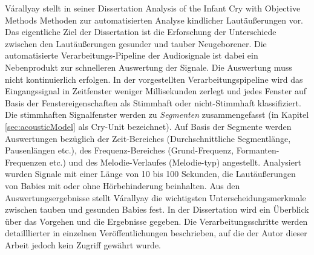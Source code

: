 Várallyay stellt in seiner Dissertation \glqq Analysis of the Infant Cry with Objective Methods\grqq{} \cite{cry_thesis} Methoden zur automatisierten Analyse kindlicher Lautäußerungen vor. Das eigentliche Ziel der Dissertation ist die Erforschung der Unterschiede zwischen den Lautäußerungen gesunder und tauber Neugeborener. Die automatisierte Verarbeitungs-Pipeline der Audiosignale ist dabei ein \glqq Nebenprodukt\grqq{} zur schnelleren Auswertung der Signale. Die Auswertung muss nicht kontinuierlich erfolgen. In der vorgestellten Verarbeitungspipeline wird das Eingangssignal in Zeitfenster weniger Millisekunden zerlegt und jedes Fenster auf Basis der Fenstereigenschaften als Stimmhaft oder nicht-Stimmhaft klassifiziert. Die stimmhaften Signalfenster werden zu \emph{Segmenten} zusammengefasst (in Kapitel \ref{sec:acousticModel} als Cry-Unit bezeichnet). Auf Basis der Segmente werden Auswertungen bezüglich der Zeit-Bereiches (Durchschnittliche Segmentlänge, Pausenlängen etc.), des Frequenz-Bereiches (Grund-Frequenz, Formanten-Frequenzen etc.) und des Melodie-Verlaufes (Melodie-typ) angestellt. Analysiert wurden Signale mit einer Länge von 10 bis 100 Sekunden, die Lautäußerungen von Babies mit oder ohne Hörbehinderung beinhalten. Aus den Auswertungsergebnisse stellt Várallyay die wichtigsten Unterscheidungsmerkmale zwischen tauben und gesunden Babies fest. In der Dissertation \cite{cry_thesis} wird ein Überblick über das Vorgehen und die Ergebnisse gegeben. Die Verarbeitungsschritte werden detailllierter in einzelnen Veröffentlichungen beschrieben, auf die der Autor dieser Arbeit jedoch kein Zugriff gewährt wurde.

